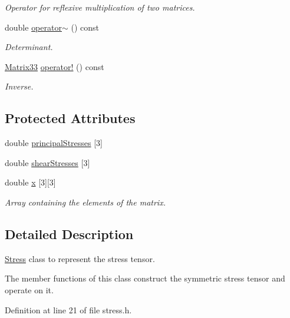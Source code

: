 \begin{DoxyCompactItemize}
\begin{DoxyCompactList}\small\item\em Operator for reflexive multiplication of two matrices. \end{DoxyCompactList}\item 
double \hyperlink{classMatrix33_a15b37caa6ab0d9f4a9f0d95846abd675}{operator$\sim$} () const 
\begin{DoxyCompactList}\small\item\em Determinant. \end{DoxyCompactList}\item 
\hyperlink{classMatrix33}{Matrix33} \hyperlink{classMatrix33_a1b822a20343a26b3c9bb7fd5c1247f37}{operator!} () const 
\begin{DoxyCompactList}\small\item\em Inverse. \end{DoxyCompactList}\end{DoxyCompactItemize}
\subsection*{Protected Attributes}
\begin{DoxyCompactItemize}
\item 
double \hyperlink{classStress_aea8c3e40aa59a89d7ba79d2c916050a6}{principal\-Stresses} \mbox{[}3\mbox{]}
\item 
double \hyperlink{classStress_a77e8705e56c2fb56826a638edf3f78bf}{shear\-Stresses} \mbox{[}3\mbox{]}
\item 
double \hyperlink{classMatrix33_af7f01fa466616eb7c8eda2e4d9f85cdd}{x} \mbox{[}3\mbox{]}\mbox{[}3\mbox{]}
\begin{DoxyCompactList}\small\item\em Array containing the elements of the matrix. \end{DoxyCompactList}\end{DoxyCompactItemize}


\subsection{Detailed Description}
\hyperlink{classStress}{Stress} class to represent the stress tensor. 

The member functions of this class construct the symmetric stress tensor and operate on it. 

Definition at line 21 of file stress.\-h.



